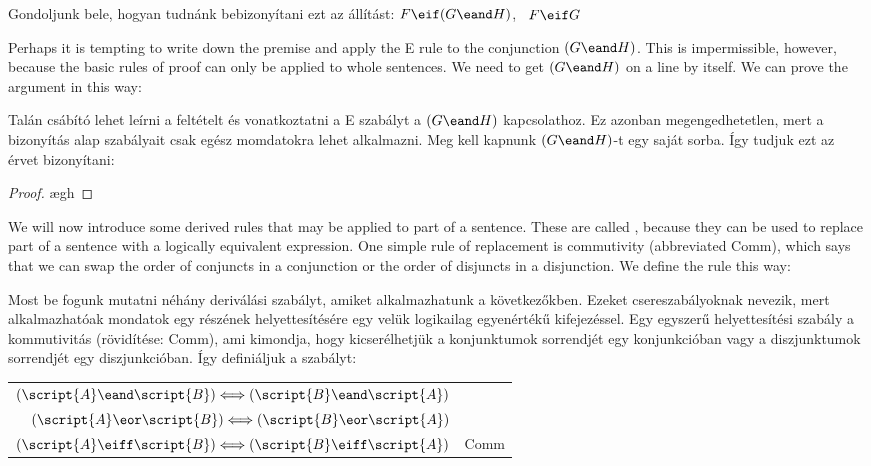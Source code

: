 Gondoljunk bele, hogyan tudnánk bebizonyítani ezt az állítást: $F\eif(G\eand H)$, \therefore\ $F\eif G$

Perhaps it is tempting to write down the premise and apply the {\eand}E rule to the conjunction $(G \eand H)$. This is impermissible, however, because the basic rules of proof can only be applied to whole sentences. We need to get $(G \eand H)$ on a line by itself. We can prove the argument in this way:

Talán csábító lehet leírni a feltételt és vonatkoztatni a {\eand}E szabályt a $(G \eand H)$ kapcsolathoz. Ez azonban megengedhetetlen, mert a bizonyítás alap szabályait csak egész momdatokra lehet alkalmazni. Meg kell kapnunk $(G \eand H)$-t egy saját sorba. Így tudjuk ezt az érvet bizonyítani:



\begin{proof}
	\open
		\ae{gh}
	\close
\end{proof}

We will now introduce some derived rules that may be applied to part of a sentence. These are called , because they can be used to replace part of a sentence with a logically equivalent expression. One simple rule of replacement is commutivity (abbreviated Comm), which says that we can swap the order of conjuncts in a conjunction or the order of disjuncts in a disjunction. We define the rule this way:

Most be fogunk mutatni néhány deriválási szabályt, amiket alkalmazhatunk a következőkben. Ezeket csereszabályoknak nevezik, mert alkalmazhatóak mondatok egy részének helyettesítésére egy velük logikailag egyenértékű kifejezéssel. Egy egyszerű helyettesítési szabály a kommutivitás (rövidítése: Comm), ami kimondja, hogy kicserélhetjük a konjunktumok sorrendjét egy konjunkcióban vagy a diszjunktumok sorrendjét egy diszjunkcióban.  Így definiáljuk a szabályt:

\begin{center}
\begin{tabular}{rl}
$(\script{A}\eand\script{B}) \Longleftrightarrow (\script{B}\eand\script{A})$\\
$(\script{A}\eor\script{B}) \Longleftrightarrow (\script{B}\eor\script{A})$\\
$(\script{A}\eiff\script{B}) \Longleftrightarrow (\script{B}\eiff\script{A})$
& Comm
\end{tabular}
\end{center}

